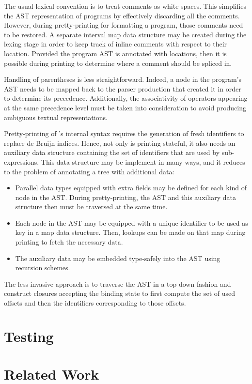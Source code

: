 The usual lexical convention is to treat comments as white spaces.
This simplifies the \ac{AST} representation of programs by effectively discarding all the comments.
However, during pretty-printing for formatting a program, those comments need to be restored.
A separate interval map data structure may be created during the lexing stage in order to keep track of inline comments with respect to their location.
Provided the program \ac{AST} is annotated with locations, then it is possible during printing to determine where a comment should be spliced in.

Handling of parentheses is less straightforward.
Indeed, a node in the program's \ac{AST} needs to be mapped back to the parser production that created it in order to determine its precedence.
Additionally, the associativity of operators appearing at the same precedence level must be taken into consideration to avoid producing ambiguous textual representations.


Pretty-printing of \Beluga's internal syntax requires the generation of fresh identifiers to replace de Bruijn indices.
Hence, not only is printing stateful, it also needs an auxiliary data structure containing the set of identifiers that are used by sub-expressions.
This data structure may be implement in many ways, and it reduces to the problem of annotating a tree with additional data:

\begin{itemize}
\item
Parallel data types equipped with extra fields may be defined for each kind of node in the \ac{AST}.
During pretty-printing, the \ac{AST} and this auxiliary data structure then must be traversed at the same time.
\item
Each node in the \ac{AST} may be equipped with a unique identifier to be used as key in a map data structure.
Then, lookups can be made on that map during printing to fetch the necessary data.
\item
The auxiliary data may be embedded type-safely into the \ac{AST} using recursion schemes.
\end{itemize}

The less invasive approach is to traverse the \ac{AST} in a top-down fashion and construct closures accepting the binding state to first compute the set of used offsets and then the identifiers corresponding to those offsets.


\section{Testing}


\section{Related Work}

